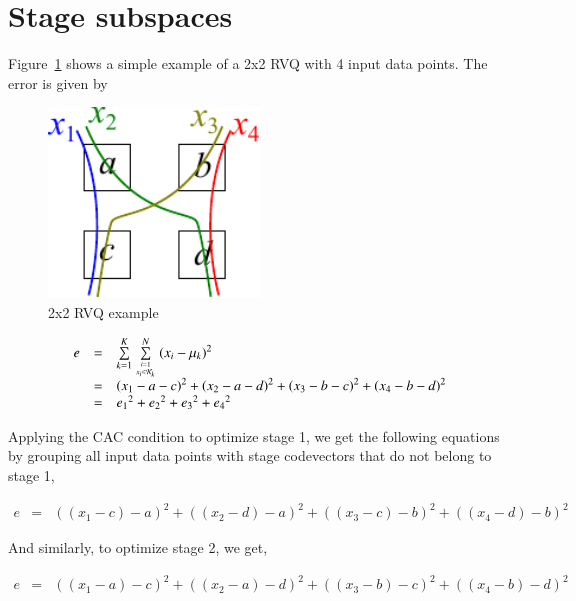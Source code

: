 \documentclass[12pt,letterpaper,doublespaced,ETD]{gt-ece-thesis}
\begin{document}
\section{Stage subspaces}
Figure~\ref{fig:Figure1} shows a simple example of a 2x2 RVQ with 4 input data points.  The error is given by

\begin{figure}
\center
\includegraphics[width=0.5\textwidth]{thesis2/RVQ_CAC_toyExample2_2x2.pdf}
\caption{2x2 RVQ example}
\label{fig:Figure1}
\end{figure}

\begin{equation}
\begin{array}{lllll}
e &=& \sum\limits_{k=1}^K \sum\limits_{{i=1 \atop x_i \in \mathcal{K}_k}}^N {(x_i - \mu_k)}^2 \\
&=& {(x_1 - a - c)}^2 + {(x_2- a - d)}^2 + {(x_3 - b - c)}^2 + {(x_4 - b - d)}^2\\
&=& {e_1}^2 + {e_2}^2 + {e_3}^2 + {e_4}^2
\end{array}
\end{equation}

Applying the CAC condition to optimize stage 1, we get the following equations by grouping all input data points with stage codevectors that do not belong to stage 1,

\begin{equation}
\begin{array}{lllll}
e &=& {((x_1 - c) - a)}^2 + {((x_2- d) - a)}^2 + {((x_3 - c) - b)}^2 + {((x_4 - d) - b)}^2
\end{array}
\label{Eqn:2x2RVQ_stage1}
\end{equation}

And similarly, to optimize stage 2, we get,

\begin{equation}
\begin{array}{lllll}
e &=& {((x_1 - a) - c)}^2 + {((x_2- a) - d)}^2 + {((x_3 - b) - c)}^2 + {((x_4 - b) - d)}^2
\end{array}
\label{Eqn:2x2RVQ_stage2}
\end{equation}
\end{document}
